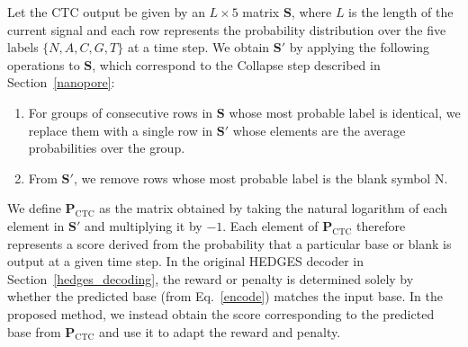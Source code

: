 \documentclass[sotsuron]{kuee}
\begin{document}
Let the CTC output be given by an $L\times 5$ matrix $\bm{S}$, where $L$ is the length of the current signal
and each row represents the probability distribution over the five labels $\{N,A,C,G,T\}$ at a time step.
We obtain $\bm{S}'$ by applying the following operations to $\bm{S}$, which correspond to the Collapse
step described in Section~\ref{nanopore}:
\begin{enumerate}
  \item For groups of consecutive rows in $\bm{S}$ whose most probable label is identical, we replace them
  with a single row in $\bm{S}'$ whose elements are the average probabilities over the group.
  \item From $\bm{S}'$, we remove rows whose most probable label is the blank symbol N.
\end{enumerate}
We define $\bm{P}_{\mathrm{CTC}}$ as the matrix obtained by taking the natural logarithm of each element
in $\bm{S}'$ and multiplying it by $-1$.
Each element of $\bm{P}_{\mathrm{CTC}}$ therefore represents a score derived from the probability that a
particular base or blank is output at a given time step.
In the original HEDGES decoder in Section~\ref{hedges_decoding}, the reward or penalty is determined solely
by whether the predicted base (from Eq.~\eqref{encode}) matches the input base.
In the proposed method, we instead obtain the score corresponding to the predicted base from $\bm{P}_{\mathrm{CTC}}$
and use it to adapt the reward and penalty.
\end{document}
